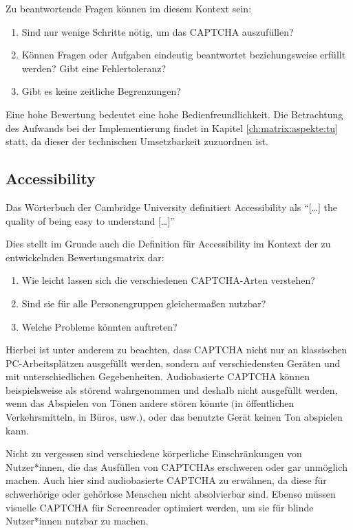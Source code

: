 Zu beantwortende Fragen können im diesem Kontext sein:
\begin{enumerate}
    \item Sind nur wenige Schritte nötig, um das CAPTCHA auszufüllen?
    \item Können Fragen oder Aufgaben eindeutig beantwortet beziehungsweise erfüllt werden? Gibt eine Fehlertoleranz?
    \item Gibt es keine zeitliche Begrenzungen?
\end{enumerate}

Eine hohe Bewertung bedeutet eine hohe Bedienfreundlichkeit. 
Die Betrachtung des Aufwands bei der Implementierung findet in Kapitel \ref{ch:matrix:aspekte:tu} statt, da dieser der technischen Umsetzbarkeit zuzuordnen ist.

\subsection{Accessibility}
\label{ch:matrix:aspekte:accessibility}
Das Wörterbuch der Cambridge University definitiert Accessibility als ``$[$\dots$]$ the quality of being easy to understand $[$\dots$]$'' \cite{CACD:2008}

Dies stellt im Grunde auch die Definition für Accessibility im Kontext der zu entwickelnden Bewertungsmatrix dar:

\begin{enumerate}
\item Wie leicht lassen sich die verschiedenen CAPTCHA-Arten verstehen?
\item Sind sie für alle Personengruppen gleichermaßen nutzbar?
\item Welche Probleme könnten auftreten?
\end{enumerate}

Hierbei ist unter anderem zu beachten, dass CAPTCHA nicht nur an klassischen PC-Arbeitsplätzen ausgefüllt werden,
sondern auf verschiedensten Geräten und mit unterschiedlichen Gegebenheiten.
Audiobasierte CAPTCHA können beispielsweise als störend wahrgenommen und deshalb nicht ausgefüllt werden,
wenn das Abspielen von Tönen andere stören könnte $($in öffentlichen Verkehrsmitteln, in Büros, usw.$)$,
oder das benutzte Gerät keinen Ton abspielen kann.

Nicht zu vergessen sind verschiedene körperliche Einschränkungen von Nutzer*innen,
die das Ausfüllen von CAPTCHAs erschweren oder gar unmöglich machen. Auch hier sind audiobasierte CAPTCHA zu erwähnen,
da diese für schwerhörige oder gehörlose Menschen nicht absolvierbar sind.
Ebenso müssen visuelle CAPTCHA für Screenreader optimiert werden, um sie für blinde Nutzer*innen nutzbar zu machen.

